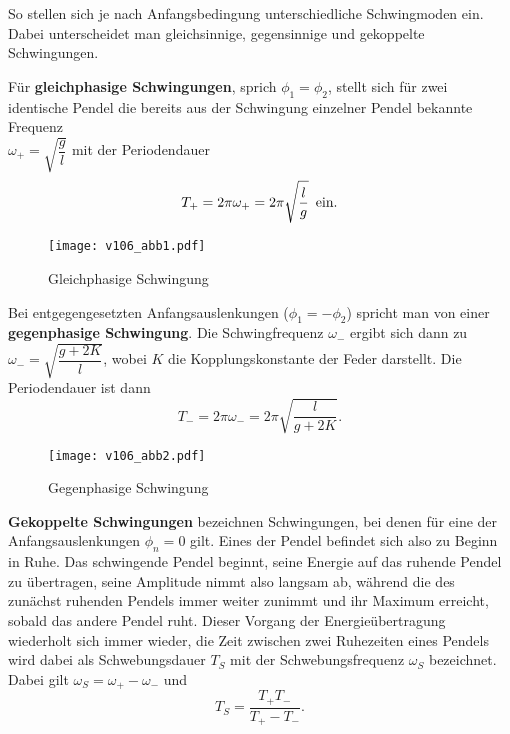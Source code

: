 So stellen sich je nach Anfangsbedingung unterschiedliche Schwingmoden ein. Dabei unterscheidet man gleichsinnige, gegensinnige und gekoppelte Schwingungen. \\

\newpage

Für \textbf{gleichphasige Schwingungen}, sprich $\phi_1=\phi_2$, stellt sich für zwei identische Pendel die bereits aus der Schwingung einzelner Pendel bekannte Frequenz \\ 
$\omega_+=\sqrt{\dfrac{g}{l}}$ mit der Periodendauer 
\begin{equation}
T_+ = 2\pi \omega_+ = 2\pi \sqrt{\dfrac{l}{g}} \text{\, ein.}
\label{eq:T_+}
\end{equation}

\begin{figure}
    \centering
    \texttt{[image: v106\_abb1.pdf]}
    \caption{Gleichphasige Schwingung}
\end{figure}

Bei entgegengesetzten Anfangsauslenkungen ($\phi_1=-\phi_2$) spricht man von einer \\ 
\textbf{gegenphasige Schwingung}. Die Schwingfrequenz $\omega_-$ ergibt sich dann zu \\
$\omega_- = \sqrt{\dfrac{g+2K}{l}}$, wobei $K$ die Kopplungskonstante der Feder darstellt.
Die Periodendauer ist dann 
\begin{equation}
    T_- = 2 \pi \omega_- = 2 \pi \sqrt{\dfrac{l}{g+2K}}\text{.}
\label{eq:T_-}
\end{equation}

\begin{figure}
    \centering
    \texttt{[image: v106\_abb2.pdf]}
    \caption{Gegenphasige Schwingung}
\end{figure}

\textbf{Gekoppelte Schwingungen} bezeichnen Schwingungen, bei denen für eine der Anfangsauslenkungen $\phi_n = 0$ gilt. Eines der Pendel befindet sich also zu Beginn in Ruhe.
Das schwingende Pendel beginnt, seine Energie auf das ruhende Pendel zu übertragen, seine Amplitude nimmt also langsam ab, während die des zunächst ruhenden Pendels immer weiter zunimmt und ihr Maximum erreicht, sobald das andere Pendel ruht.
Dieser Vorgang der Energieübertragung wiederholt sich immer wieder, die Zeit zwischen zwei Ruhezeiten eines Pendels wird dabei als Schwebungsdauer $T_S$ mit der Schwebungsfrequenz $\omega_S$ bezeichnet. \\
Dabei gilt $\omega_S= \omega_+ -\omega_-$ und
\begin{equation}
    T_S = \dfrac{T_+ T_-}{T_+ - T_-} \text{.}
\label{eq:T_S}
\end{equation}

